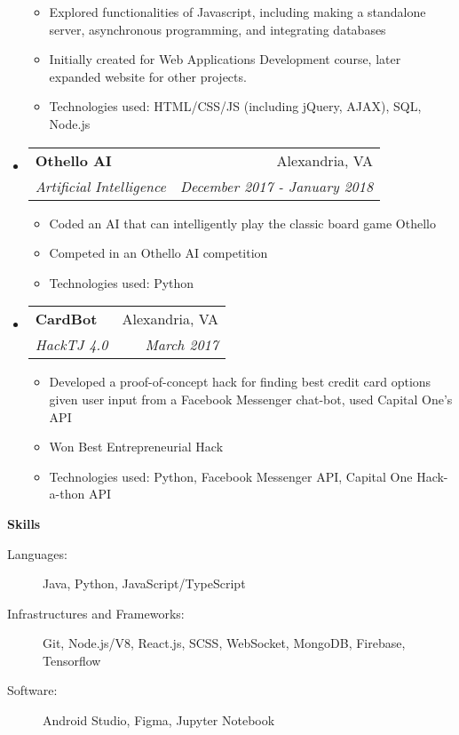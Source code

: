 \documentclass[letterpaper,11pt]{article}
\makeatletter
\newcommand{\resitem}[1]{\item #1 \vspace{-2pt}}
\newcommand{\resheading}[1]{{\large \colorbox{mygrey}{\begin{minipage}{\textwidth}{\textbf{#1 \vphantom{p\^{E}}}}\end{minipage}}}}
\newcommand{\ressubheading}[4]{
\begin{tabular*}{7.0in}{l@{\extracolsep{\fill}}r}
		\textbf{#1} & #2 \\
		\textit{#3} & \textit{#4} \\
\end{tabular*}\vspace{-6pt}}
\makeatother
\begin{document}
\begin{itemize}
\begin{itemize}
		\resitem{Explored functionalities of Javascript, including making a standalone server, asynchronous programming, and integrating databases}
		\resitem{Initially created for Web Applications Development course, later expanded website for other projects.}
		\resitem{Technologies used: HTML/CSS/JS (including jQuery, AJAX), SQL, Node.js}
	\end{itemize}
\item
    \ressubheading{Othello AI}{Alexandria, VA}{Artificial Intelligence}{December 2017 - January 2018}
    \begin{itemize}
        \resitem{Coded an AI that can intelligently play the classic board game Othello}
        \resitem{Competed in an Othello AI competition}
        \resitem{Technologies used: Python}
    \end{itemize}
\item
    \ressubheading{CardBot}{Alexandria, VA}{HackTJ 4.0}{March 2017}
    \begin{itemize}
        \resitem{Developed a proof-of-concept hack for finding best credit card options given user input from a Facebook Messenger chat-bot, used Capital One's API}
        \resitem{Won Best Entrepreneurial Hack}
        \resitem{Technologies used: Python, Facebook Messenger API, Capital One Hack-a-thon API}
    \end{itemize}
\end{itemize}


\resheading{Skills}

\begin{description}
\item[Languages:] Java, Python, JavaScript/TypeScript
\item[Infrastructures and Frameworks:] Git, Node.js/V8, React.js, SCSS, WebSocket, MongoDB, Firebase, Tensorflow
\item[Software:] Android Studio, Figma, Jupyter Notebook
\end{description}

\end{document}
